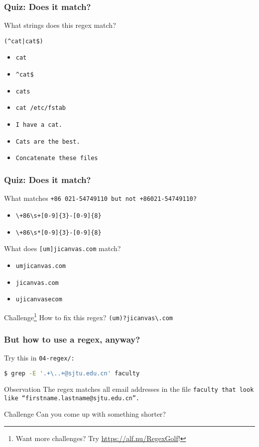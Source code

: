 \begin{frame}[fragile]
\frametitle{Quiz: Does it match?}
What strings does this regex match? \newline

\Large \verb!(^cat|cat$)! \normalsize

\begin{itemize}
    \item \verb|cat|                      %
    \item \verb|^cat$|                    %
    \item \verb|cats|                     %
    \item \verb|cat /etc/fstab|           %
    \item \verb|I have a cat.|            %
    \item \verb|Cats are the best.|       %
    \item \verb|Concatenate these files|  %
\end{itemize}
\end{frame}

\begin{frame}[fragile]
\frametitle{Quiz: Does it match?}
What matches \tt{+86 021-54749110} but not \tt{+86021-54749110}?
\begin{itemize}
    \item \verb|\+86\s+[0-9]{3}-[0-9]{8}|
    \item \verb|\+86\s*[0-9]{3}-[0-9]{8}| %
\end{itemize}

What does \Large \verb|[um]jicanvas.com| \normalsize match?
\begin{itemize}
    \item \tt{umjicanvas.com}
    \item \tt{jicanvas.com}
    \item \tt{ujicanvasecom} %
\end{itemize}

\begin{block}{Challenge\footnote{Want more challenges? Try \url{https://alf.nu/RegexGolf}!}}
    How to fix this regex? \pause \verb|(um)?jicanvas\.com|
\end{block}
\end{frame}

\begin{frame}[fragile]
\frametitle{But how to use a regex, anyway?}
Try this in \tt{04-regex/}:
\begin{lstlisting}[language=bash]
$ grep -E '.+\..+@sjtu.edu.cn' faculty
\end{lstlisting}
\pause
\begin{block}{Observation}
    The regex matches all email addresses in the file \tt{faculty}
    that look like ``firstname.lastname@sjtu.edu.cn''.
\end{block}
\begin{block}{Challenge}
    Can you come up with something shorter?
\end{block}
\end{frame}

